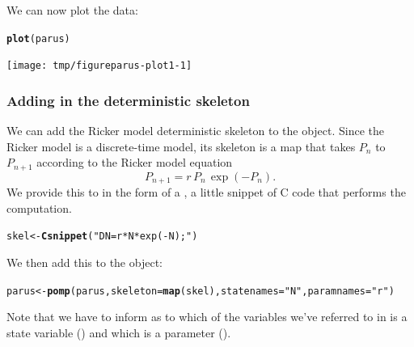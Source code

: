 \documentclass{beamer}\usepackage[]{graphicx}\usepackage[]{color}
\makeatletter
\newcommand{\hlstr}[1]{\textcolor[rgb]{0.192,0.494,0.8}{#1}}%
\newcommand{\hlstd}[1]{\textcolor[rgb]{0.345,0.345,0.345}{#1}}%
\newcommand{\hlkwb}[1]{\textcolor[rgb]{0.69,0.353,0.396}{#1}}%
\newcommand{\hlkwc}[1]{\textcolor[rgb]{0.333,0.667,0.333}{#1}}%
\newcommand{\hlkwd}[1]{\textcolor[rgb]{0.737,0.353,0.396}{\textbf{#1}}}%
\newenvironment{kframe}{%
 \def\at@end@of@kframe{}%
 \ifinner\ifhmode%
  \def\at@end@of@kframe{\end{minipage}}%
  \begin{minipage}{\columnwidth}%
 \fi\fi%
 \def\FrameCommand##1{\hskip\@totalleftmargin \hskip-\fboxsep
 \colorbox{shadecolor}{##1}\hskip-\fboxsep
     \hskip-\linewidth \hskip-\@totalleftmargin \hskip\columnwidth}%
 \MakeFramed {\advance\hsize-\width
   \@totalleftmargin\z@ \linewidth\hsize
   \@setminipage}}%
 {\par\unskip\endMakeFramed%
 \at@end@of@kframe}
\newenvironment{knitrout}{}{} %
\makeatother
\begin{document}
\begin{frame}[fragile]
\bi
\item  We can now plot the data:
\ei
\begin{knitrout}\small
{}\color{fgcolor}\begin{kframe}
\begin{alltt}
\hlkwd{plot}\hlstd{(parus)}
\end{alltt}
\end{kframe}
\end{knitrout}
\begin{knitrout}\small
{}\color{fgcolor}

{\centering \texttt{[image: tmp/figureparus-plot1-1]} 

}



\end{knitrout}

\end{frame}

\begin{frame}[fragile]

\frametitle{Adding in the deterministic skeleton}

We can add the Ricker model deterministic skeleton to the   object.
Since the Ricker model is a discrete-time model, its skeleton is a map that takes $P_n$ to $P_{n+1}$ according to the Ricker model equation
\[
P_{n+1} = r\,P_{n}\,\exp(-P_{n}).
\]
We provide this to  in the form of a , a little snippet of C code that performs the computation.
\begin{knitrout}\small
{}\color{fgcolor}\begin{kframe}
\begin{alltt}
\hlstd{skel} \hlkwb{<-} \hlkwd{Csnippet}\hlstd{(}\hlstr{"DN = r*N*exp(-N);"}\hlstd{)}
\end{alltt}
\end{kframe}
\end{knitrout}
We then add this to the  object:
\begin{knitrout}\small
{}\color{fgcolor}\begin{kframe}
\begin{alltt}
\hlstd{parus} \hlkwb{<-} \hlkwd{pomp}\hlstd{(parus,}\hlkwc{skeleton}\hlstd{=}\hlkwd{map}\hlstd{(skel),}\hlkwc{statenames}\hlstd{=}\hlstr{"N"}\hlstd{,}\hlkwc{paramnames}\hlstd{=}\hlstr{"r"}\hlstd{)}
\end{alltt}
\end{kframe}
\end{knitrout}
Note that we have to inform  as to which of the variables we've referred to in  is a state variable () and which is a parameter ().

\end{frame}
\end{document}
